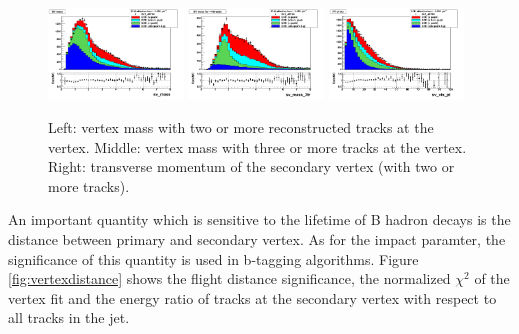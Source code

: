\begin{figure}[h!]
\centering
\includegraphics[width=0.32\textwidth]{figures/sv_mass_Linear.png}
\includegraphics[width=0.32\textwidth]{figures/sv_mass_3tr_Linear.png}
\includegraphics[width=0.32\textwidth]{figures/sv_vtx_pt_Linear.png}
\caption{Left: vertex mass with two or more reconstructed tracks at the vertex. Middle: vertex mass with three or more tracks at the vertex. Right: transverse momentum of the secondary vertex (with two or more tracks). }
\label{fig:vertexMass}
\end{figure}


An important quantity which is sensitive to the lifetime of B hadron decays is the  distance between primary and secondary vertex. As for the impact paramter, the significance of this quantity is used in b-tagging algorithms. Figure \ref{fig:vertexdistance} shows the flight distance significance, the normalized $\chi^2$ of the vertex fit and the energy ratio of tracks at the secondary vertex with respect to all tracks in the jet.

